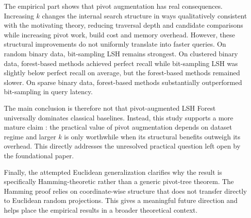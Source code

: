 \documentclass[11pt]{article}
\begin{document}
The empirical part shows that pivot augmentation has real consequences. Increasing $k$ changes the internal search structure in ways qualitatively consistent with the motivating theory, reducing traversal depth and candidate comparisons while increasing pivot work, build cost and memory overhead. However, these structural improvements do not uniformly translate into faster queries. On random binary data, bit-sampling LSH remains strongest. On clustered binary data, forest-based methods achieved perfect recall while bit-sampling LSH was slightly below perfect recall on average, but the forest-based methods remained slower. On sparse binary data, forest-based methods substantially outperformed bit-sampling in query latency.

The main conclusion is therefore not that pivot-augmented LSH Forest universally dominates classical baselines. Instead, this study supports a more mature claim : the practical value of pivot augmentation depends on dataset regime and larger $k$ is only worthwhile when its structural benefits outweigh its overhead. This directly addresses the unresolved practical question left open by the foundational paper.

Finally, the attempted Euclidean generalization clarifies why the result is specifically Hamming-theoretic rather than a generic pivot-tree theorem. The Hamming proof relies on coordinate-wise structure that does not transfer directly to Euclidean random projections. This gives a meaningful future direction and helps place the empirical results in a broader theoretical context.
\end{document}
